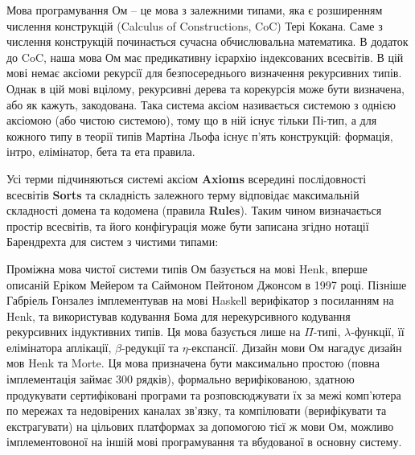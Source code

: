 Мова програмування Ом -- це мова з залежними типами, яка є розширенням
числення конструкцій (Calculus of Constructions, CoC) Тері Кокана. Саме з числення
конструкцій починається сучасна обчислювальна математика. В додаток до CoC,
наша мова Ом має предикативну ієрархію індексованих всесвітів. В цій мові немає
аксіоми рекурсії для безпосереднього визначення рекурсивних типів. Однак в цій мові
вцілому, рекурсивні дерева та корекурсія може бути визначена, або як кажуть, закодована.
Така система аксіом називається системою з однією аксіомою (або чистою системою), тому що в ній
існує тільки Пі-тип, а для кожного типу в теорії типів Мартіна Льофа існує п'ять
конструкцій: формація, інтро, елімінатор, бета та ета правила.

Усі терми підчиняються системі аксіом \textbf{Axioms} всередині
послідовності всесвітів \textbf{Sorts} та складність залежного
терму відповідає максимальній складності домена та кодомена
(правила \textbf{Rules}). Таким чином визначається простір всесвітів,
та його конфігурація може бути записана згідно нотації
Барендрехта для систем з чистими типами:

Проміжна мова чистої системи типів Ом базується на мові
Henk\cite{Erik97}, вперше описаній Еріком Мейером та Саймоном Пейтоном Джонсом в 1997 році.
Пізніше Габріель Гонзалез імплементував на мові Haskell
верифікатор з посиланням на Henk, та використував кодування Бома для нерекурсивного
кодування рекурсивних індуктивних типів. Ця мова базується лише на $\Pi$-типі,
$\lambda$-функції, її елімінатора аплікації, $\beta$-редукції та $\eta$-експансії.
Дизайн мови Ом нагадує дизайн мов Henk та Morte.
Ця мова призначена бути максимально простою (повна імплементація займає 300 рядків),
формально верифікованою, здатною продукувати сертифіковані програми та
розповсюджувати їх за межі комп'ютера по мережах та недовірених каналах зв'язку,
та компілювати (верифікувати та екстрагувати) на цільових платформах за допомогою
тієї ж мови Ом, можливо імплементовоної на іншій мові програмування та вбудованої
в основну систему.

